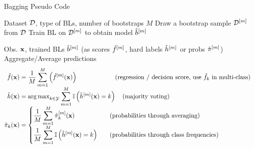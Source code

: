 \documentclass[11pt,compress,t,notes=noshow, xcolor=table]{beamer}
\begin{document}
\begin{vbframe}{Bagging Pseudo Code}
\vspace{-2ex}
\begin{algorithm}[H]
  \scriptsize
  \caption*{Bagging algorithm: Training}
  \begin{algorithmic}[1]
     Dataset $\mathcal{D}$, type of BLs, number of bootstraps $M$
      \State Draw a bootstrap sample $\mathcal{D}^{[m]}$ from $\mathcal{D}$
      \State Train BL on $\mathcal{D}^{[m]}$ to obtain model $\hat{b}^{[m]}$
    \EndFor
  \end{algorithmic}
\end{algorithm}
\vspace{-0.7cm}
\begin{algorithm}[H]
  \scriptsize
  \caption*{Bagging algorithm: Prediction}
  \begin{algorithmic}[1]
     Obs. $\mathbf{x}$, trained BLs $\hat{b}^{[m]}$ (as scores $\hat{f}^{[m]}$, hard labels $\hat{h}^{[m]}$ or probs $\hat \pi^{[m]}$)
    \State Aggregate/Average predictions
    \vspace{-2ex}
    \begin{align*}
      \hat{f}(\mathbf{x}) &= \frac{1}{M} \sum_{m=1}^M \left(\hat{f}^{[m]}(\mathbf{x})\right) \qquad \qquad \qquad \text{(regression / decision score, use $\hat{f}_k$ in multi-class)} \\[-1ex]
      \hat{h}(\mathbf{x}) &= \operatorname{arg\,max}_{k \in \mathcal{Y}} \sum_{m=1}^M \mathbb{I} \left(\hat{h}^{[m]}(\mathbf{x}) = k\right) \quad \text{(majority voting)} \\[-1ex]
    \hat \pi_{k}(\mathbf{x}) &=
    \left\{
    \begin{aligned}
    & \frac{1}{M} \sum_{m=1}^M \hat \pi_{k}^{[m]}(\mathbf{x}) \quad && \text{(probabilities through averaging)} \\[-1ex]
    & \frac{1}{M} \sum_{m=1}^M \mathbb{I} \left(\hat{h}^{[m]}(\mathbf{x}) = k \right) \quad && \text{(probabilities through class frequencies)}
    \end{aligned}
    \right.
    \end{align*}
    \vspace{-3ex}
  \end{algorithmic}
\end{algorithm}
\vspace{-3ex}
\end{vbframe}
\end{document}
